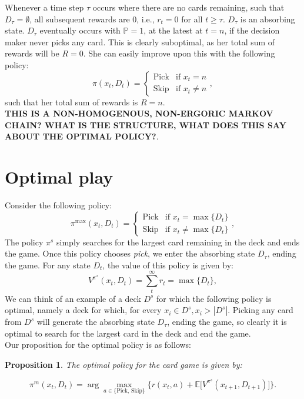 \documentclass{article}
\newtheorem{proposition}[theorem]{Proposition}
\begin{document}
Whenever a time step $\tau$ occurs where there are no cards remaining, such that $D_\tau = \emptyset$, all subsequent rewards are $0$, i.e., $r_t=0$ for all $t \geq \tau$. $D_\tau$ is an absorbing state.
$D_\tau$ eventually occurs with $\mathbb{P}=1$, at the latest at $t=n$, if the decision maker never picks any card. This is clearly suboptimal, as her total sum of rewards will be $R=0$. She can easily improve upon this with the following policy:
\begin{equation}
    \pi(x_t, D_t) = \begin{cases}
        \text{Pick} & \text{if } x_t = n    \\
        \text{Skip} & \text{if } x_t \neq n
    \end{cases},
\end{equation}
such that her total sum of rewards is $R=n$.\\

\textbf{THIS IS A NON-HOMOGENOUS, NON-ERGORIC MARKOV CHAIN? WHAT IS THE STRUCTURE, WHAT DOES THIS SAY ABOUT THE OPTIMAL POLICY?}.

\section{Optimal play}
Consider the following policy:
\begin{equation}
    \pi^{\max}(x_t, D_t) = \begin{cases}
        \text{Pick} & \text{if } x_t = \max\{D_t\}    \\
        \text{Skip} & \text{if } x_t \neq \max\{D_t\}
    \end{cases},
\end{equation}
The policy $\pi^s$ simply searches for the largest card remaining in the deck and ends the game. Once this policy chooses \textit{pick}, we enter the absorbing state $D_\tau$, ending the game. For any state $D_t$, the value of this policy is given by:
\begin{equation}
    V^{\pi^s}(x_t, D_t)= \sum^\infty_t r_t = \max\{D_t\},
\end{equation}
We can think of an example of a deck $D^s$ for which the following policy is optimal, namely a deck for which, for every $x_i \in D^s, x_i > |D^s|$. Picking any card from $D^s$ will generate the absorbing state $D_\tau$, ending the game, so clearly it is optimal to search for the largest card in the deck and end the game.\\

Our proposition for the optimal policy is as follows:
\begin{proposition}
    The optimal policy for the card game is given by:

    \begin{equation}
        \pi^m(x_t, D_t) = \arg \max_{a \in \{\text{Pick, Skip}\}}\Big\{r(x_t,a) + \mathbb{E}\Big[V^{\pi^s}(x_{t+1}, D_{t+1})\Big]\Big\}.
    \end{equation}
\end{proposition}
\end{document}
